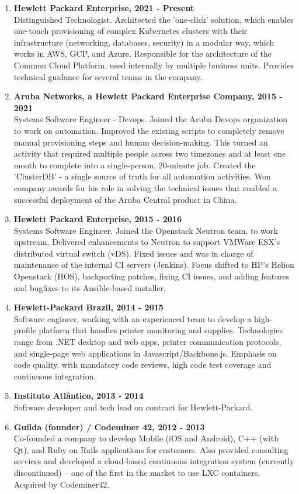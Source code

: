 \documentclass[letterpaper]{article}
\begin{document}
\begin{enumerate}
  \item
  \textbf{Hewlett Packard Enterprise, 2021 - Present} \\
  Distinguished Technologist. Architected the 'one-click' solution, which enables one-touch provisioning of complex Kubernetes clusters with their infrastructure (networking, databases, security) in a modular way, which works in AWS, GCP, and Azure. Responsible for the architecture of the Common Cloud Platform, used internally by multiple business units. Provides technical guidance for several teams in the company.
  \item
  \textbf{Aruba Networks, a Hewlett Packard Enterprise Company, 2015 - 2021} \\
  Systems Software Engineer - Devops. Joined the Aruba Devops organization to work on automation. Improved the existing scripts to completely remove manual provisioning steps and human decision-making. This turned an activity that required multiple people across two timezones and at least one month to complete into a single-person, 20-minute job. Created the 'ClusterDB' - a single source of truth for all automation activities. Won company awards for his role in solving the technical issues that enabled a successful deployment of the Aruba Central product in China.
  \item
  \textbf{Hewlett Packard Enterprise, 2015 - 2016} \\
  Systems Software Engineer. Joined the Openstack Neutron team, to work upstream. Delivered enhancements to Neutron to support VMWare ESX's distributed virtual switch (vDS). Fixed issues and was in charge of maintenance of the internal CI servers (Jenkins). Focus shifted to HP's Helion Openstack (HOS), backporting patches, fixing CI issues, and adding features and bugfixes to its Ansible-based installer.
  \item 
  \textbf{Hewlett-Packard Brazil, 2014 - 2015} \\
  Software engineer, working with an experienced team to develop a high-profile platform that handles printer monitoring and supplies. Technologies range from .NET desktop and web apps, printer communication protocols, and single-page web applications in Javascript/Backbone.js. Emphasis on code quality, with mandatory code reviews, high code test coverage and continuous integration.
  \item
  \textbf{Instituto Atlântico, 2013 - 2014} \\
  Software developer and tech lead on contract for Hewlett-Packard.
  \item
  \textbf{Guilda (founder) / Codeminer 42, 2012 - 2013 } \\
  Co-founded a company to develop Mobile (iOS and Android), C++ (with Qt), and Ruby on Rails applications for customers. Also provided consulting services and developed a cloud-based continuous integration system (currently discontinued) – one of the first in the market to use LXC containers. Acquired by Codeminer42.


\end{enumerate}
\end{document}
